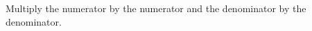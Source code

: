 \documentclass[preview]{standalone}
\begin{document}
\begin{center}
Multiply the numerator by the numerator and the denominator by the denominator.
\end{center}
\end{document}
